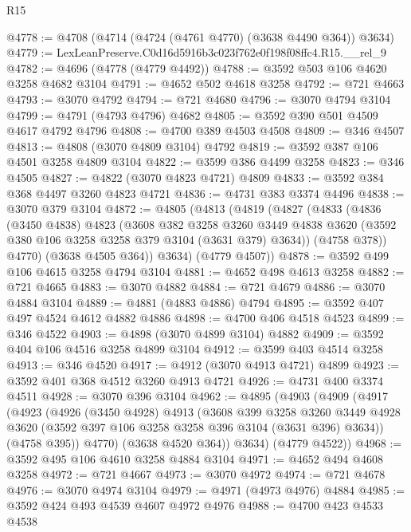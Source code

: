 \begin{lexlean}{R15}
\begin{coremodule}
@4778 := @4708 (@4714 (@4724 (@4761 @4770) (@3638 @4490 @364)) @3634)
@4779 := LexLeanPreserve.C0d16d5916b3c023f762e0f198f08ffc4.R15.__rel_9
@4782 := @4696 (@4778 (@4779 @4492))
@4788 := @3592 @503 @106 @4620 @3258 @4682 @3104
@4791 := @4652 @502 @4618 @3258
@4792 := @721 @4663
@4793 := @3070 @4792
@4794 := @721 @4680
@4796 := @3070 @4794 @3104
@4799 := @4791 (@4793 @4796) @4682
@4805 := @3592 @390 @501 @4509 @4617 @4792 @4796
@4808 := @4700 @389 @4503 @4508
@4809 := @346 @4507
@4813 := @4808 (@3070 @4809 @3104) @4792
@4819 := @3592 @387 @106 @4501 @3258 @4809 @3104
@4822 := @3599 @386 @4499 @3258
@4823 := @346 @4505
@4827 := @4822 (@3070 @4823 @4721) @4809
@4833 := @3592 @384 @368 @4497 @3260 @4823 @4721
@4836 := @4731 @383 @3374 @4496
@4838 := @3070 @379 @3104
@4872 := @4805
    (@4813
      (@4819
        (@4827
          (@4833
            (@4836
              (@3450 @4838)
              @4823
              (@3608
                @382
                @3258
                @3260
                @3449
                @4838
                @3620
                (@3592 @380 @106 @3258 @3258 @379 @3104 (@3631 @379) @3634))
              (@4758 @378))
            @4770)
          (@3638 @4505 @364))
        @3634)
      (@4779 @4507))
@4878 := @3592 @499 @106 @4615 @3258 @4794 @3104
@4881 := @4652 @498 @4613 @3258
@4882 := @721 @4665
@4883 := @3070 @4882
@4884 := @721 @4679
@4886 := @3070 @4884 @3104
@4889 := @4881 (@4883 @4886) @4794
@4895 := @3592 @407 @497 @4524 @4612 @4882 @4886
@4898 := @4700 @406 @4518 @4523
@4899 := @346 @4522
@4903 := @4898 (@3070 @4899 @3104) @4882
@4909 := @3592 @404 @106 @4516 @3258 @4899 @3104
@4912 := @3599 @403 @4514 @3258
@4913 := @346 @4520
@4917 := @4912 (@3070 @4913 @4721) @4899
@4923 := @3592 @401 @368 @4512 @3260 @4913 @4721
@4926 := @4731 @400 @3374 @4511
@4928 := @3070 @396 @3104
@4962 := @4895
    (@4903
      (@4909
        (@4917
          (@4923
            (@4926
              (@3450 @4928)
              @4913
              (@3608
                @399
                @3258
                @3260
                @3449
                @4928
                @3620
                (@3592 @397 @106 @3258 @3258 @396 @3104 (@3631 @396) @3634))
              (@4758 @395))
            @4770)
          (@3638 @4520 @364))
        @3634)
      (@4779 @4522))
@4968 := @3592 @495 @106 @4610 @3258 @4884 @3104
@4971 := @4652 @494 @4608 @3258
@4972 := @721 @4667
@4973 := @3070 @4972
@4974 := @721 @4678
@4976 := @3070 @4974 @3104
@4979 := @4971 (@4973 @4976) @4884
@4985 := @3592 @424 @493 @4539 @4607 @4972 @4976
@4988 := @4700 @423 @4533 @4538

\end{coremodule}
\end{lexlean}

